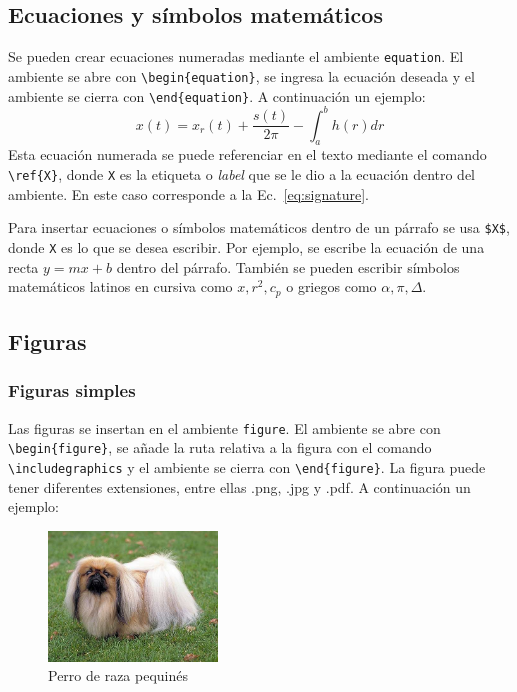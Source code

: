 \documentclass[a4paper, titletoc, 12pt]{article}
\begin{document}
\subsection*{Ecuaciones y símbolos matemáticos}
Se pueden crear ecuaciones numeradas mediante el ambiente \verb!equation!. El ambiente se abre con \verb!\begin{equation}!, se ingresa la ecuación deseada y el ambiente se cierra con \verb!\end{equation}!. A continuación un ejemplo:
\begin{equation}\label{eq:signature}
    x(t) = x_{r}(t) + \frac{s(t)}{2\pi} - \int_{a}^{b} h(r) dr
\end{equation}
Esta ecuación numerada se puede referenciar en el texto mediante el comando \verb!\ref{X}!, donde \verb!X! es la etiqueta o \textit{label} que se le dio a la ecuación dentro del ambiente. En este caso corresponde a la Ec.~\ref{eq:signature}.

Para insertar ecuaciones o símbolos matemáticos dentro de un párrafo se usa \verb!$X$!, donde \verb!X! es lo que se desea escribir. Por ejemplo, se escribe la ecuación de una recta $y = mx + b$ dentro del párrafo. También se pueden escribir símbolos matemáticos latinos en cursiva como $x, r^{2}, c_{p}$ o griegos como $\alpha, \pi, \Delta$.

\subsection*{Figuras}
\subsubsection*{Figuras simples}
Las figuras se insertan en el ambiente \verb!figure!. El ambiente se abre con \verb!\begin{figure}!, se añade la ruta relativa a la figura con el comando \verb!\includegraphics! y el ambiente se cierra con \verb!\end{figure}!. La figura puede tener diferentes extensiones, entre ellas .png, .jpg y .pdf. A continuación un ejemplo:

\begin{figure}[h]
    \centering    
    \includegraphics[width=0.4\textwidth]{F-Pequines.jpg} 
    \caption{Perro de raza pequinés}
    \label{fig:F-Pequines}
\end{figure}
\end{document}
